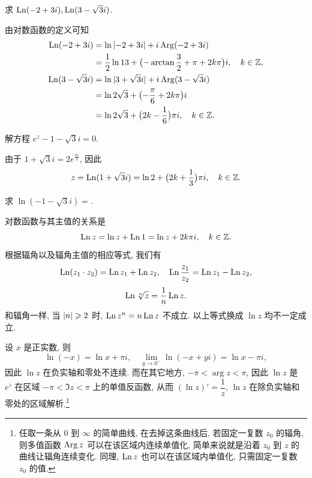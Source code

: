 \begin{example}
  求 $\operatorname{Ln}(-2+3i),\operatorname{Ln}(3-\sqrt3 i)$.
\end{example}

\begin{solution}
  由对数函数的定义可知
  \begin{align*}
    \operatorname{Ln}(-2+3i)&=\ln{\lvert-2+3i\rvert}+i\operatorname{Arg}(-2+3i)\\
      &=\frac 12\ln{13}+\bigl(-\arctan\frac 32+\pi+2k\pi\bigr)i,
      \quad k\in{\mathbb{Z}},\\
    \operatorname{Ln}(3-\sqrt3i)&=\ln|3+\sqrt 3i|+i\operatorname{Arg}(3-\sqrt 3i)\\
      &=\ln 2\sqrt 3+\bigl(-\frac\pi6+2k\pi\bigr)i\\
      &=\ln 2\sqrt 3+\bigl(2k-\frac16\bigr)\pi i,
      \quad k\in{\mathbb{Z}}.
  \end{align*}
\end{solution}

\begin{example}
  解方程 $e^z-1-\sqrt 3i=0$.
\end{example}

\begin{solution}
  由于 $1+\sqrt 3 i=2e^{\frac{\pi i}3}$, 因此
  \[
    z=\operatorname{Ln}(1+\sqrt 3i)=\ln 2+\bigl(2k+\frac13\bigr)\pi i,\quad k\in{\mathbb{Z}}.
  \]
\end{solution}

\begin{exercise}
  求 $\ln(-1-\sqrt3 i)=$\fillblank{}.
\end{exercise}

对数函数与其主值的关系是
\[
  \operatorname{Ln} z=\ln z+\operatorname{Ln} 1=\ln z+2k\pi i,\quad k\in{\mathbb{Z}}.
\]
根据辐角以及辐角主值的相应等式, 我们有
\[
  \operatorname{Ln}(z_1\cdot z_2)=\operatorname{Ln} z_1+\operatorname{Ln} z_2,\quad
  \operatorname{Ln}\frac{z_1}{z_2}=\operatorname{Ln} z_1-\operatorname{Ln} z_2,
\]
\[
  \operatorname{Ln} \sqrt[n]z=\dfrac1n\operatorname{Ln} z.
\]
和辐角一样, 当 $\left|n\right|\geqslant 2$ 时, \alert{$\operatorname{Ln} z^n=n\operatorname{Ln} z$ 不成立}.
以上等式换成 $\ln z$ 均不一定成立.

设 $x$ 是正实数, 则
\[
  \ln (-x)=\ln x+\pi i,\quad
  \lim_{y\to0^-}\ln (-x+yi)=\ln x-\pi i,
\]
因此 $\ln z$ 在负实轴和零处不连续.
而在其它地方, $-\pi<\arg z<\pi$, 因此 $\ln z$ 是 $e^z$ 在区域 $-\pi<\Im z<\pi$ 上的单值反函数, 
从而 \alert{$(\ln z)'=\dfrac 1z$}, \alert{$\ln z$ 在除负实轴和零处的区域解析}.\footnote{%
  任取一条从 $0$ 到 $\infty$ 的简单曲线, 在去掉这条曲线后, 若固定一复数 $z_0$ 的辐角, 则多值函数 $\operatorname{Arg} z$ 可以在该区域内连续单值化, 简单来说就是沿着 $z_0$ 到 $z$ 的曲线让辐角连续变化. 同理, $\operatorname{Ln} z$ 也可以在该区域内单值化, 只需固定一复数 $z_0$ 的值.
}


